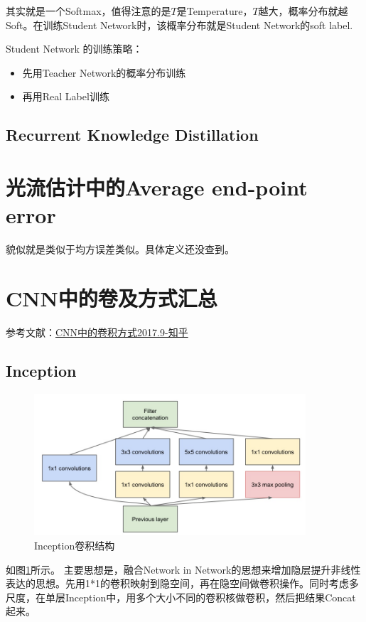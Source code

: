 其实就是一个Softmax，值得注意的是$T$是Temperature，$T$越大，概率分布就越Soft。在训练Student Network时，该概率分布就是Student Network的soft label.

Student Network 的训练策略：
\begin{itemize}
\item 先用Teacher Network的概率分布训练
\item 再用Real Label训练
\end{itemize}

\subsection{Recurrent Knowledge Distillation \cite{Silvia2018Recurrent}}

\section{光流估计中的Average end-point error}

貌似就是类似于均方误差类似。具体定义还没查到。

\section{CNN中的卷及方式汇总}

参考文献：\href{https://zhuanlan.zhihu.com/p/29367273}{CNN中的卷积方式2017.9-知乎}

\subsection{Inception}

\begin{figure}[!htbp]
\centering
\includegraphics[width=0.9\textwidth]{DLTips/Inception0.jpg}
\caption{Inception卷积结构}
\label{Inception0}
\end{figure}
如图\ref{Inception0}所示。
主要思想是，融合Network in Network的思想来增加隐层提升非线性表达的思想。先用1*1的卷积映射到隐空间，再在隐空间做卷积操作。同时考虑多尺度，在单层Inception中，用多个大小不同的卷积核做卷积，然后把结果Concat起来。

